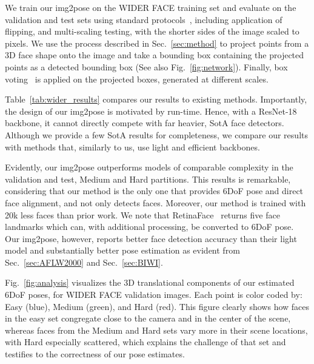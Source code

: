 \documentclass[final]{cvpr}
\newcommand{\minisection}[1]{\vspace{1mm}\noindent{\textbf{#1}.}}
\begin{document}
We train our img2pose on the WIDER FACE training set and evaluate on the validation and test sets using standard protocols~\cite{retinaface, ssh_face, s3_face}, including application of flipping, and multi-scaling testing, with the shorter sides of the image scaled to   pixels. We use the process described in Sec.~\ref{sec:method} to project points from a 3D face shape onto the image and take a bounding box containing the projected points as a detected bounding box (See also Fig.~\ref{fig:network}). Finally, box voting~\cite{gidaris2015object} is applied on the projected boxes, generated at different scales.

\begin{figure*}[!ht]
\end{figure*}


\minisection{WIDER FACE detection results} Table~\ref{tab:wider_results} compares our results to existing methods. Importantly, the design of our img2pose is motivated by run-time. Hence, with a ResNet-18 backbone, it cannot directly compete with far heavier, SotA face detectors. Although we provide a few SotA results for completeness, we compare our results with methods that, similarly to us, use light and efficient backbones. 

Evidently, our img2pose outperforms models of comparable complexity in the validation and test,  Medium and Hard partitions. This results is remarkable, considering that our method is the only one that provides 6DoF pose and direct face alignment, and not only detects faces. Moreover, our method is trained with 20k less faces than prior work. We note that RetinaFace~\cite{retinaface} returns five face landmarks which can, with additional processing, be converted to 6DoF pose. Our img2pose, however, reports better face detection accuracy than their light model and substantially better pose estimation as evident from Sec.~\ref{sec:AFLW2000} and Sec.~\ref{sec:BIWI}.

Fig.~\ref{fig:analysis} visualizes the 3D translational components of our estimated 6DoF poses, for WIDER FACE validation images. Each  point is color coded by: Easy (blue), Medium (green), and Hard (red). This figure clearly shows how faces in the easy set congregate close to the camera and in the center of the scene, whereas faces from the Medium and Hard sets vary more in their scene locations, with Hard especially scattered, which explains the challenge of that set and testifies to the correctness of our pose estimates. 
\end{document}
